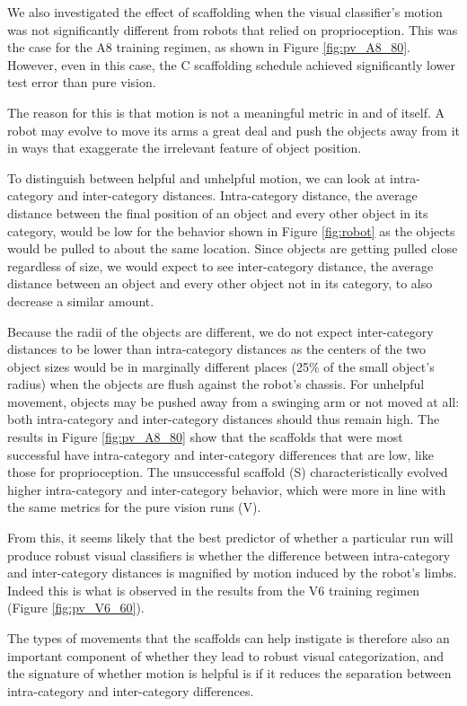 \documentclass{sig-alternate}
\begin{document}
We also investigated the effect of scaffolding when the visual classifier's motion was not significantly different from robots that relied on proprioception.
This was the case for the A8 training regimen, as shown in Figure \ref{fig:pv_A8_80}. However, even in this case, the C scaffolding schedule achieved significantly lower test error than pure vision.

The reason for this is that motion is not a meaningful metric in and of itself. A robot may evolve to move its arms a great deal and push the objects away from it in ways that exaggerate the irrelevant feature of object position.

To distinguish between helpful and unhelpful motion, we can look at intra-category and inter-category distances. Intra-category distance, the average distance between the final position of an object and every other object in its category, would be low for the behavior shown in Figure \ref{fig:robot} as the objects would be pulled to about the same location. Since objects are getting pulled close regardless of size, we would expect to see inter-category distance, the average distance between an object and every other object not in its category, to also decrease a similar amount.

Because the radii of the objects are different, we do not expect inter-category distances to be lower than intra-category distances as the centers of the two object sizes would be in marginally different places (25\% of the small object's radius) when the objects are flush against the robot's chassis. For unhelpful movement, objects may be pushed away from a swinging arm or not moved at all: both intra-category and inter-category distances should thus remain high.
The results in Figure \ref{fig:pv_A8_80} show that the scaffolds that were most successful have intra-category and inter-category differences that are low, like those for proprioception.
The unsuccessful scaffold (S) characteristically evolved higher intra-category and inter-category behavior, which were more in line with the same metrics for the pure vision runs (V). 

From this, it seems likely that the best predictor of whether a particular run will produce robust visual classifiers is whether the difference between intra-category and inter-category distances is magnified by motion induced by the robot's limbs. Indeed this is what is observed in the results from the V6 training regimen (Figure \ref{fig:pv_V6_60}).

The types of movements that the scaffolds can help instigate is therefore also an important component of whether they lead to robust visual categorization, and the signature of whether motion is helpful is if it reduces the separation between intra-category and inter-category differences. 
\end{document}

